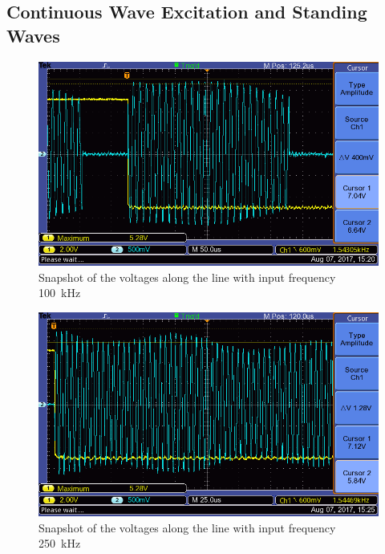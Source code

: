 \documentclass[a4paper]{scrartcl}
\begin{document}
\subsection{Continuous Wave Excitation and Standing Waves}
\begin{figure}
    \centering
    \includegraphics[width = 15cm]{data/ALL0009/F0009TEK.png}
    \caption{Snapshot of the voltages along the line with input frequency \SI{100}{\kilo\hertz}}
    \label{fig:100kHz-line}
\end{figure}
\begin{figure}
    \centering
    \includegraphics[width = 15cm]{data/ALL0012/F0012TEK.png}
    \caption{Snapshot of the voltages along the line with input frequency \SI{250}{\kilo\hertz}}
    \label{fig:250kHz-line}
\end{figure}
\end{document}

